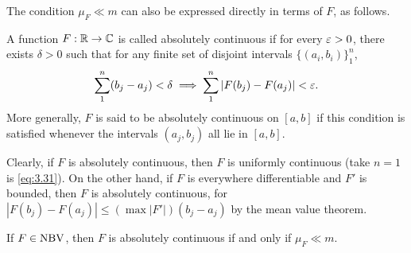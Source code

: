 \documentclass[12pt]{article} %
\begin{document}
The condition $\mu_F \ll m$ can also be expressed directly in terms of $F$, as follows. 

\begin{definition}
    A function $F : \mathbb{R} \to \mathbb{C}$ is called absolutely continuous if for every $\varepsilon > 0$, there exists $\delta > 0$ such that for any finite set of disjoint intervals $\{(a_i, b_i)\}_1^n$, \begin{align}\label{eq:3.31}
        \sum_1^n (b_j - a_j) < \delta \implies \sum_1^n |F(b_j) - F(a_j)| < \varepsilon.
    \end{align}
    More generally, $F$ is said to be absolutely continuous on $[a,b]$ if this condition is satisfied whenever the intervals $(a_j, b_j)$ all lie in $[a,b]$.
\end{definition}

\noindent Clearly, if $F$ is absolutely continuous, then $F$ is uniformly continuous (take $n = 1$ is \cref{eq:3.31}). On the other hand, if $F$ is everywhere differentiable and $F'$ is bounded, then $F$ is absolutely continuous, for $|F(b_j) - F(a_j)| \leq (\max |F'|)(b_j - a_j)$ by the mean value theorem. 

\begin{proposition}\label{prop:3.32}
    If $F \in \operatorname{NBV}$, then $F$ is absolutely continuous if and only if $\mu_F \ll m$. 
\end{proposition}
\end{document}
